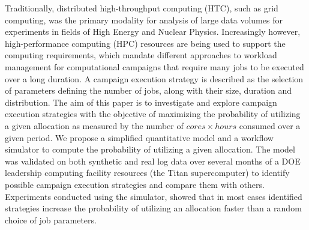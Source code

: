 Traditionally, distributed high-throughput  computing (HTC), such as grid
computing, was the primary modality for analysis of large data volumes for
experiments in fields of High Energy and Nuclear Physics.
Increasingly however, high-performance computing (HPC) resources are being
used to support the computing requirements, which mandate different
approaches to workload management for computational campaigns that require
many jobs to be executed over a long duration.
A campaign execution strategy is described as the selection of parameters
defining the number of jobs, along with their size, duration and distribution.
The aim of this paper is to investigate and explore campaign execution
strategies with the objective of maximizing the probability of utilizing a
given allocation as measured by the number of $cores \times hours$ consumed
over a given period.
We propose a simplified quantitative model and a workflow simulator to compute
the probability of utilizing a given allocation.
The model was validated on both synthetic and real log data over several
months of a DOE leadership computing facility resources (the Titan
supercomputer) to identify possible campaign execution strategies and
compare them with others.
Experiments conducted using the simulator, showed that in most cases
identified strategies increase the probability of utilizing an allocation
faster than a random choice of job parameters.


